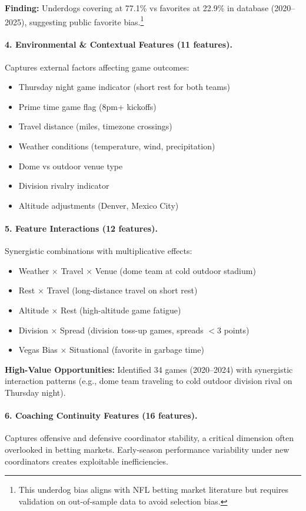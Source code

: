 \noindent\textbf{Finding:} Underdogs covering at 77.1\% vs favorites at 22.9\% in database (2020--2025), suggesting public favorite bias.\footnote{This underdog bias aligns with NFL betting market literature but requires validation on out-of-sample data to avoid selection bias.}

\paragraph{4. Environmental \& Contextual Features (11 features).}
Captures external factors affecting game outcomes:
\begin{itemize}
  \item Thursday night game indicator (short rest for both teams)
  \item Prime time game flag (8pm+ kickoffs)
  \item Travel distance (miles, timezone crossings)
  \item Weather conditions (temperature, wind, precipitation)
  \item Dome vs outdoor venue type
  \item Division rivalry indicator
  \item Altitude adjustments (Denver, Mexico City)
\end{itemize}

\paragraph{5. Feature Interactions (12 features).}
Synergistic combinations with multiplicative effects:
\begin{itemize}
  \item Weather × Travel × Venue (dome team at cold outdoor stadium)
  \item Rest × Travel (long-distance travel on short rest)
  \item Altitude × Rest (high-altitude game fatigue)
  \item Division × Spread (division toss-up games, spreads $< 3$ points)
  \item Vegas Bias × Situational (favorite in garbage time)
\end{itemize}

\noindent\textbf{High-Value Opportunities:} Identified 34 games (2020--2024) with synergistic interaction patterns (e.g., dome team traveling to cold outdoor division rival on Thursday night).

\paragraph{6. Coaching Continuity Features (16 features).}
Captures offensive and defensive coordinator stability, a critical dimension often overlooked in betting markets. Early-season performance variability under new coordinators creates exploitable inefficiencies.

